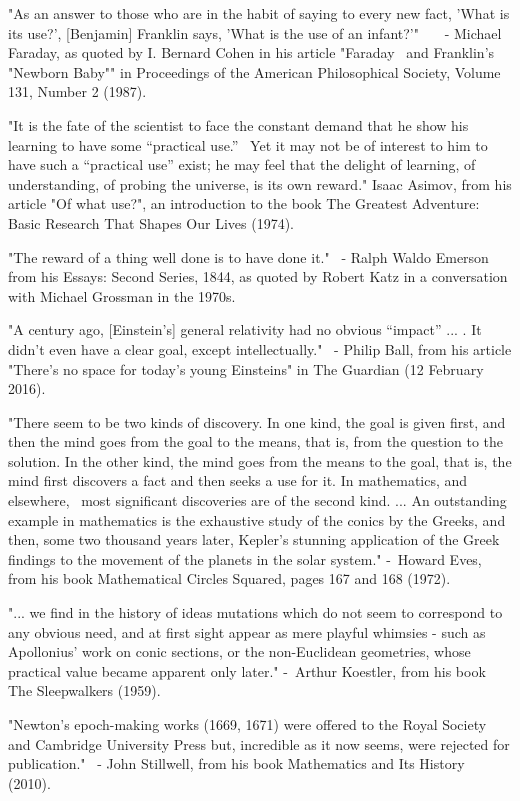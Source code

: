 \documentclass[12pt]{article}
\begin{document}
"As an answer to those who are in the habit of saying to every new fact, 'What is its use?', [Benjamin] Franklin says, 'What is the use of an infant?'"   
 - Michael Faraday, as quoted by I. Bernard Cohen in his article "Faraday  and Franklin's "Newborn Baby"" in Proceedings of the American Philosophical Society, Volume 131, Number 2 (1987). 

"It is the fate of the scientist to face the constant demand that he show his learning to have some “practical use.”  Yet it may not be of interest to him to have such a “practical use” exist; he may feel that the delight of learning, of understanding, of probing the universe, is its own reward."
Isaac Asimov, from his article "Of what use?", an introduction to the book The Greatest Adventure: Basic Research That Shapes Our Lives (1974).

"The reward of a thing well done is to have done it."
 - Ralph Waldo Emerson from his Essays: Second Series, 1844, as quoted by Robert Katz in a conversation with Michael Grossman in the 1970s.

"A century ago, [Einstein's] general relativity had no obvious “impact” ... . It didn’t even have a clear goal, except intellectually."
 - Philip Ball, from his article "There’s no space for today’s young Einsteins" in The Guardian (12 February 2016).

"There seem to be two kinds of discovery. In one kind, the goal is given first, and then the mind goes from the goal to the means, that is, from the question to the solution. In the other kind, the mind goes from the means to the goal, that is, the mind first discovers a fact and then seeks a use for it. In mathematics, and elsewhere,  most significant discoveries are of the second kind. ... An outstanding example in mathematics is the exhaustive study of the conics by the Greeks, and then, some two thousand years later, Kepler's stunning application of the Greek findings to the movement of the planets in the solar system."
- Howard Eves, from his book Mathematical Circles Squared, pages 167 and 168 (1972).

"... we find in the history of ideas mutations which do not seem to correspond to any obvious need, and at first sight appear as mere playful whimsies - such as Apollonius' work on conic sections, or the non-Euclidean geometries, whose practical value became apparent only later."
- Arthur Koestler, from his book The Sleepwalkers (1959).

"Newton's epoch-making works (1669, 1671) were offered to the Royal Society and Cambridge University Press but, incredible as it now seems, were rejected for publication."
 - John Stillwell, from his book Mathematics and Its History (2010).
\end{document}
